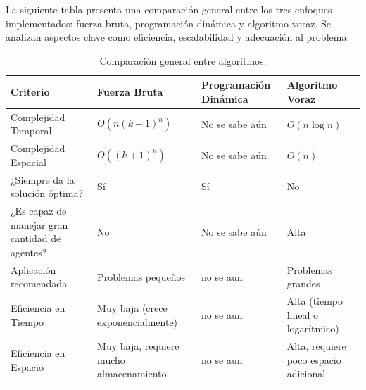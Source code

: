 \documentclass[11pt,letter]{article}
\begin{document}
    La siguiente tabla presenta una comparación general entre los tres enfoques implementados: fuerza bruta, programación dinámica y algoritmo voraz. Se analizan aspectos clave como eficiencia, escalabilidad y adecuación al problema:

    \begin{table}[H]
        \centering
        \renewcommand{\arraystretch}{1.5}
        \begin{tabular}{C{4cm} C{3cm} C{3.5cm} C{3.5cm}}
            \toprule
            \textbf{Criterio}                              & \textbf{Fuerza Bruta}                   & \textbf{Programación Dinámica} & \textbf{Algoritmo Voraz}              \\
            \midrule
            Complejidad Temporal                           & \( O(n(k+1)^n) \)                       & No se sabe aún                 & \( O(n \log n) \)                     \\
            Complejidad Espacial                           & \( O((k+1)^n) \)                        & No se sabe aún                 & \( O(n) \)                            \\
            ¿Siempre da la solución óptima?                & Sí                                      & Sí                             & No                                    \\
            ¿Es capaz de manejar gran cantidad de agentes? & No                                      & No se sabe aún                 & Alta                                  \\
            Aplicación recomendada                         & Problemas pequeños                      & no se aun                      & Problemas grandes                     \\
            Eficiencia en Tiempo                           & Muy baja (crece exponencialmente)       & no se aun                      & Alta (tiempo lineal o logarítmico)    \\
            Eficiencia en Espacio                          & Muy baja, requiere mucho almacenamiento & no se aun                      & Alta, requiere poco espacio adicional \\
            \bottomrule
        \end{tabular}
        \caption{Comparación general entre algoritmos.}
    \end{table}
\end{document}
